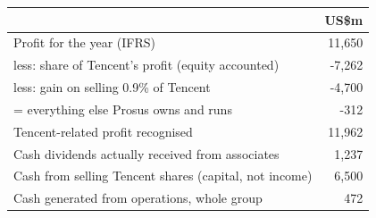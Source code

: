 \begin{tabular}{lr}
\toprule
 & US\$m \\
\midrule
Profit for the year (IFRS) & 11,650 \\
less: share of Tencent's profit (equity accounted) & -7,262 \\
less: gain on selling 0.9\% of Tencent & -4,700 \\
= everything else Prosus owns and runs & -312 \\
Tencent-related profit recognised & 11,962 \\
Cash dividends actually received from associates & 1,237 \\
Cash from selling Tencent shares (capital, not income) & 6,500 \\
Cash generated from operations, whole group & 472 \\
\bottomrule
\end{tabular}
